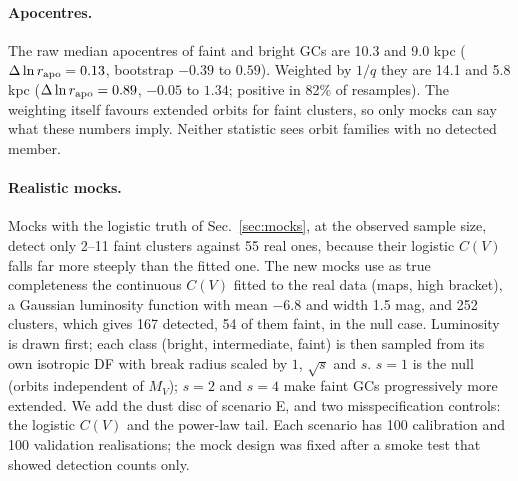 \documentclass[11pt,a4paper]{article}
\newcommand{\MV}{M_V}
\begin{document}
\paragraph{Apocentres.} The raw median apocentres of faint and bright GCs are 10.3 and 9.0 kpc
($\Delta\ln r_{\rm apo} = 0.13$, bootstrap $-0.39$ to $0.59$). Weighted by $1/q$ they are 14.1 and 5.8 kpc
($\Delta\ln r_{\rm apo} = 0.89$, $-0.05$ to $1.34$; positive in 82\% of resamples). The weighting itself
favours extended orbits for faint clusters, so only mocks can say what these numbers imply. Neither
statistic sees orbit families with no detected member.

\paragraph{Realistic mocks.} Mocks with the logistic truth of Sec.~\ref{sec:mocks}, at the observed sample
size, detect only 2--11 faint clusters against 55 real ones, because their logistic $C(V)$ falls far more steeply than the fitted one.
The new mocks use as true completeness the continuous $C(V)$ fitted to the real data (maps, high
bracket), a Gaussian luminosity function with mean $-6.8$ and width 1.5 mag, and 252 clusters, which
gives 167 detected, 54 of them faint, in the null case. Luminosity is drawn first; each class (bright,
intermediate, faint) is then sampled from its own isotropic DF with break radius scaled by $1$,
$\sqrt{s}$ and $s$. $s=1$ is the null (orbits independent of $\MV$); $s=2$ and $s=4$ make faint GCs
progressively more extended. We add the dust disc of scenario E, and two misspecification controls:
the logistic $C(V)$ and the power-law tail. Each scenario has 100 calibration and 100 validation
realisations; the mock design was fixed after a smoke test that showed detection counts only.
\end{document}
